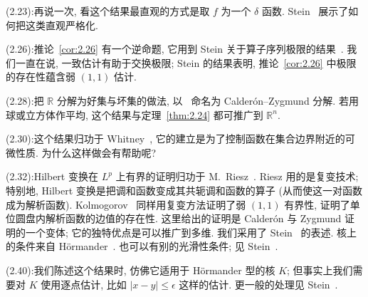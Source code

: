 \noindent (2.23):\quad 再说一次, 看这个结果最直观的方式是取 $f$ 为一个 $\delta$ 函数. Stein~\cite{stein-limits} 展示了如何把这类直观严格化.

\noindent (2.26):\quad 推论~\ref{cor:2.26} 有一个逆命题, 它用到 Stein 关于算子序列极限的结果~\cite{stein-limits}. 我们一直在说, 一致估计有助于交换极限; Stein 的结果表明, 推论~\ref{cor:2.26} 中极限的存在性蕴含弱 $(1,1)$ 估计.

\noindent (2.28):\quad 把 $\mathbb{R}$ 分解为好集与坏集的做法, 以~\cite{calderon-zygmund} 命名为 Calder\'on--Zygmund 分解. 若用球或立方体作平均, 这个结果与定理~\ref{thm:2.24} 都可推广到 $\mathbb{R}^n$.

\noindent (2.30):\quad 这个结果归功于 Whitney~\cite{whitney}, 它的建立是为了控制函数在集合边界附近的可微性质. 为什么这样做会有帮助呢?

\noindent (2.32):\quad Hilbert 变换在 $L^{p}$ 上有界的证明归功于 M.~Riesz~\cite{riesz}. Riesz 用的是复变技术; 特别地, Hilbert 变换是把调和函数变成其共轭调和函数的算子 (从而使这一对函数成为解析函数). Kolmogorov~\cite{kolmogorov} 同样用复变方法证明了弱 $(1,1)$ 有界性, 证明了单位圆盘内解析函数的边值的存在性. 这里给出的证明是 Calder\'on 与 Zygmund 证明的一个变体; 它的独特优点是可以推广到多维. 我们采用了 Stein~\cite{stein-singular} 的表述. 核上的条件来自 H\"ormander~\cite{hormander}. 也可以有别的光滑性条件; 见 Stein~\cite{stein-singular}.

\noindent (2.40):\quad 我们陈述这个结果时, 仿佛它适用于 H\"ormander 型的核 $K$; 但事实上我们需要对 $K$ 使用逐点估计, 比如 $|x-y|\leq\epsilon$ 这样的估计. 更一般的处理见 Stein~\cite{stein-singular}.
